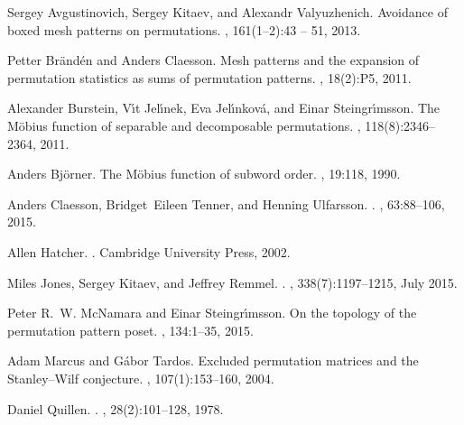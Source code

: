 \documentclass[preprint,11pt]{elsarticle}
\numberwithin{equation}{section}
\numberwithin{figure}{section}
\numberwithin{thm}{section}
\begin{document}
%
%
\begin{thebibliography}{BJJS11}

Sergey Avgustinovich, Sergey Kitaev, and Alexandr Valyuzhenich.
\newblock Avoidance of boxed mesh patterns on permutations.
, 161(1–2):43 -- 51, 2013.

Petter Br{\"a}nd{\'e}n and Anders Claesson.
\newblock Mesh patterns and the expansion of permutation statistics as sums of
  permutation patterns.
, 18(2):P5, 2011.

Alexander Burstein, V{\'{\i}}t Jel{\'{\i}}nek, Eva Jel{\'{\i}}nkov{\'a}, and
  Einar Steingr{\'{\i}}msson.
\newblock The {M}\"obius function of separable and decomposable permutations.
, 118(8):2346--2364,
  2011.

Anders Bj{\"o}rner.
\newblock The {M}{\"o}bius function of subword order.
, 19:118, 1990.

Anders Claesson, Bridget~Eileen Tenner, and Henning Ulfarsson.
.
, 63:88--106, 2015.

Allen Hatcher.
.
\newblock Cambridge University Press, 2002.

Miles Jones, Sergey Kitaev, and Jeffrey Remmel.
.
, 338(7):1197--1215, July 2015.

Peter R.~W. McNamara and Einar Steingr{\'\i}msson.
\newblock On the topology of the permutation pattern poset.
, 134:1--35, 2015.

Adam Marcus and G{\'a}bor Tardos.
\newblock Excluded permutation matrices and the {S}tanley--{W}ilf conjecture.
, 107(1):153--160,
  2004.

Daniel Quillen.
.
, 28(2):101--128, 1978.


\end{thebibliography}
\end{document}
